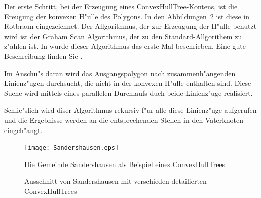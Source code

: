 Der erste Schritt, bei der Erzeugung eines ConvexHullTree-Kontens, ist die Ereugung der konvexen H"ulle des Polygons. In den Abbildungen~\ref{fig:sand2} ist diese in Rotbraun eingezeichnet. Der Allgorithmus, der zur Erzeugung der H"ulle benutzt wird ist der Graham Scan Algorithmus, der zu den Standard-Allgorithem zu z"ahlen ist. In \cite{G72} wurde dieser Algorithmus das erste Mal beschrieben. Eine gute Beschreibung finden Sie .

Im Anschu"s daran wird das Ausgangspolygon nach zusammenh"angenden Linienz"ugen durchsucht, die nicht in der konvexen H"ulle enthalten sind. Diese Suche wird mittels eines parallelen Durchlaufs duch beide Linienz"uge realisiert.

Schlie"slich wird diser Algorithmus rekursiv f"ur alle diese Linienz"uge aufgerufen und die Ergebnisse werden an die entsprechenden Stellen in den Vaterknoten eingeh"angt.

\begin{figure}
	\centering
	\texttt{[image: Sandershausen.eps]}
	\caption{Die Gemeinde Sandershausen als Beispiel eines ConvexHullTrees}
	\label{fig:Sanders}
\end{figure}
\begin{figure}
\hfill
{}
\caption{Ausschnitt von Sandershausen mit verschieden detailierten ConvexHullTrees}
\label{fig:sand2}
\end{figure}

